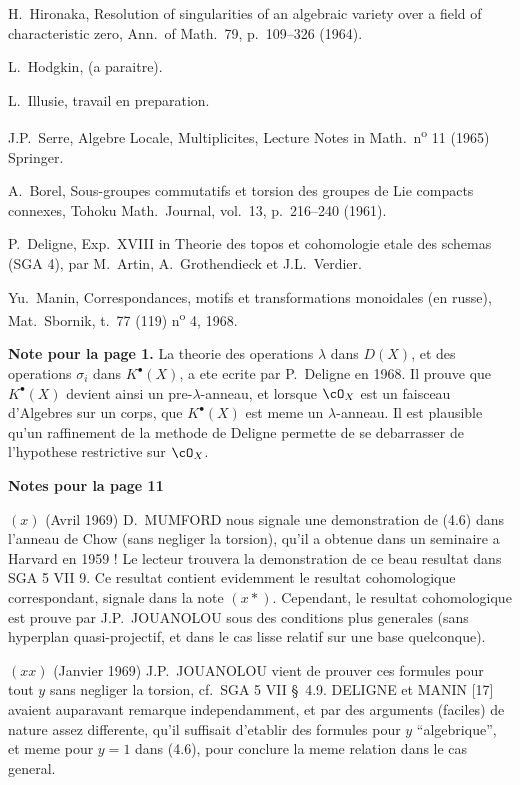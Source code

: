\begin{enumerate}[label={[\arabic*]}]
\item[{[11]}] H.\ Hironaka, Resolution of singularities of an algebraic variety over a field of characteristic zero, Ann.\ of Math.\ 79, p.\ 109--326 (1964).
\item[{[12]}] L.\ Hodgkin, (a paraitre).
\item[{[13]}] L.\ Illusie, travail en preparation.
\item[{[14]}] J.P.\ Serre, Algebre Locale, Multiplicites, Lecture Notes in Math.\ n\textsuperscript{o} 11 (1965) Springer.
\item[{[15]}] A.\ Borel, Sous-groupes commutatifs et torsion des groupes de Lie compacts connexes, Tohoku Math.\ Journal, vol.\ 13, p.\ 216--240 (1961).
\item[{[16]}] P.\ Deligne, Exp.\ XVIII in Theorie des topos et cohomologie etale des schemas (SGA 4), par M.\ Artin, A.\ Grothendieck et J.L.\ Verdier.
\item[{[17]}] Yu.\ Manin, Correspondances, motifs et transformations monoidales (en russe), Mat.\ Sbornik, t.\ 77 (119) n\textsuperscript{o} 4, 1968.
\end{enumerate}

\vspace{1cm}
\noindent\textbf{Note pour la page 1.} La theorie des operations $\lambda$ dans $D(X)$, et des operations $\sigma_i$ dans $K^{\bullet}(X)$, a ete ecrite par P.\ Deligne en 1968. Il prouve que $K^{\bullet}(X)$ devient ainsi un pre-$\lambda$-anneau, et lorsque $\cO_X$ est un faisceau d'Algebres sur un corps, que $K^{\bullet}(X)$ est meme un $\lambda$-anneau. Il est plausible qu'un raffinement de la methode de Deligne permette de se debarrasser de l'hypothese restrictive sur $\cO_X$.

\vspace{0.5cm}
\noindent\textbf{Notes pour la page 11}

\noindent $(x)$ (Avril 1969) D.\ MUMFORD nous signale une demonstration de (4.6) dans l'anneau de Chow (sans negliger la torsion), qu'il a obtenue dans un seminaire a Harvard en 1959 ! Le lecteur trouvera la demonstration de ce beau resultat dans SGA 5 VII 9. Ce resultat contient evidemment le resultat cohomologique correspondant, signale dans la note $(x*)$. Cependant, le resultat cohomologique est prouve par J.P.\ JOUANOLOU sous des conditions plus generales (sans hyperplan quasi-projectif, et dans le cas lisse relatif sur une base quelconque).

\vspace{0.3cm}
\noindent $(xx)$ (Janvier 1969) J.P.\ JOUANOLOU vient de prouver ces formules pour tout $y$ sans negliger la torsion, cf.\ SGA 5 VII \S\ 4.9. DELIGNE et MANIN [17] avaient auparavant remarque independamment, et par des arguments (faciles) de nature assez differente, qu'il suffisait d'etablir des formules pour $y$ ``algebrique'', et meme pour $y = 1$ dans (4.6), pour conclure la meme relation dans le cas general.



